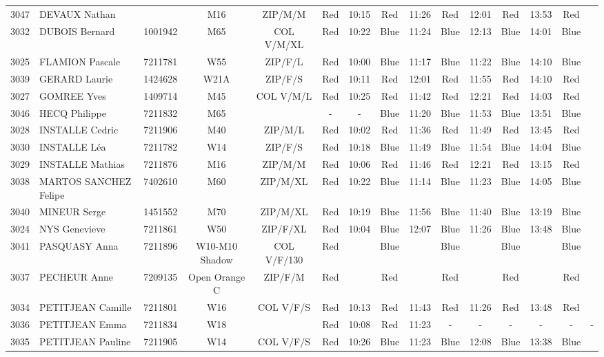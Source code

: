 \documentclass{report}
\begin{document}
\begin{longtable}{|c|l|r|c|c|*{5}{cc|}}
    3047 & DEVAUX Nathan &  & M16 & ZIP/M/M & Red & 10:15 & Red & 11:26 & Red & 12:01 & Red & 13:53 & Red &  \\
    3032 & DUBOIS Bernard & 1001942 & M65 & COL V/M/XL & Red & 10:22 & Blue & 11:24 & Blue & 12:13 & Blue & 14:01 & Blue &  \\
    3025 & FLAMION Pascale & 7211781 & W55 & ZIP/F/L & Red & 10:00 & Blue & 11:17 & Blue & 11:22 & Blue & 14:10 & Blue &  \\
    3039 & GERARD Laurie & 1424628 & W21A & ZIP/F/S & Red & 10:11 & Red & 12:01 & Red & 11:55 & Red & 14:10 & Red &  \\
    3027 & GOMREE Yves & 1409714 & M45 & COL V/M/L & Red & 10:25 & Red & 11:42 & Red & 12:21 & Red & 14:03 & Red &  \\
    3046 & HECQ Philippe & 7211832 & M65 &   & - &  - & Blue & 11:20 & Blue & 11:53 & Blue & 13:51 & Blue &  \\
    3028 & INSTALLE Cedric & 7211906 & M40 & ZIP/M/L & Red & 10:02 & Red & 11:36 & Red & 11:49 & Red & 13:45 & Red &  \\
    3030 & INSTALLE Léa & 7211782 & W14 & ZIP/F/S & Red & 10:18 & Blue & 11:49 & Blue & 11:54 & Blue & 14:04 & Blue &  \\
    3029 & INSTALLE Mathias & 7211876 & M16 & ZIP/M/M & Red & 10:06 & Red & 11:46 & Red & 12:21 & Red & 13:15 & Red &  \\
    3038 & MARTOS SANCHEZ Felipe & 7402610 & M60 & ZIP/M/XL & Red & 10:22 & Blue & 11:14 & Blue & 11:23 & Blue & 14:05 & Blue &  \\
    3040 & MINEUR Serge & 1451552 & M70 & ZIP/M/XL & Red & 10:19 & Blue & 11:56 & Blue & 11:40 & Blue & 13:19 & Blue &  \\
    3024 & NYS Genevieve & 7211861 & W50 & ZIP/F/XL & Red & 10:04 & Blue & 12:07 & Blue & 11:26 & Blue & 13:48 & Blue &  \\
    3041 & PASQUASY Anna & 7211896 & W10-M10 Shadow & COL V/F/130 & Red &   & Blue &   & Blue &   & Blue &   & Blue &  \\
    3037 & PECHEUR Anne & 7209135 & Open Orange C & ZIP/F/M & Red &   & Red &   & Red &   & Red &   & Red &  \\
    3034 & PETITJEAN Camille & 7211801 & W16 & COL V/F/S & Red & 10:13 & Red & 11:43 & Red & 11:26 & Red & 13:48 & Red &  \\
    3036 & PETITJEAN Emma & 7211834 & W18 &   & Red & 10:08 & Red & 11:23 & - &  - & - &  - & - &  -\\
    3035 & PETITJEAN Pauline & 7211905 & W14 & COL V/F/S & Red & 10:26 & Blue & 11:23 & Blue & 12:08 & Blue & 13:38 & Blue &  \\

\end{longtable}
\end{document}
